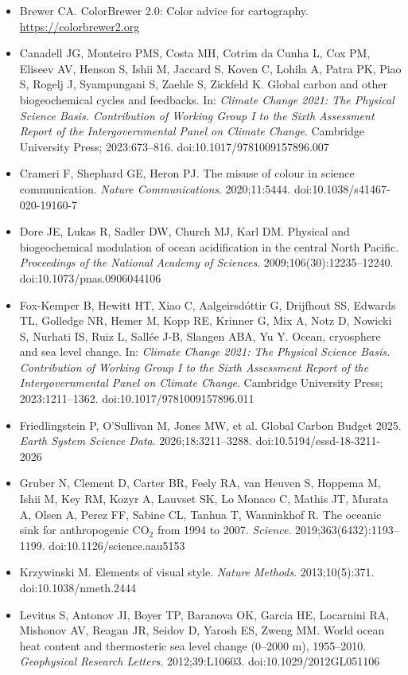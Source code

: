{\sloppy
\begin{itemize}
\item Brewer CA. ColorBrewer 2.0: Color advice for cartography. \url{https://colorbrewer2.org}
\item Canadell JG, Monteiro PMS, Costa MH, Cotrim da Cunha L, Cox PM, Eliseev AV, Henson S, Ishii M, Jaccard S, Koven C, Lohila A, Patra PK, Piao S, Rogelj J, Syampungani S, Zaehle S, Zickfeld K. Global carbon and other biogeochemical cycles and feedbacks. In: \textit{Climate Change 2021: The Physical Science Basis. Contribution of Working Group I to the Sixth Assessment Report of the Intergovernmental Panel on Climate Change}. Cambridge University Press; 2023:673--816. doi:10.1017/9781009157896.007
\item Crameri F, Shephard GE, Heron PJ. The misuse of colour in science communication. \textit{Nature Communications}. 2020;11:5444. doi:10.1038/s41467-020-19160-7
\item Dore JE, Lukas R, Sadler DW, Church MJ, Karl DM. Physical and biogeochemical modulation of ocean acidification in the central North Pacific. \textit{Proceedings of the National Academy of Sciences}. 2009;106(30):12235--12240. doi:10.1073/pnas.0906044106
\item Fox-Kemper B, Hewitt HT, Xiao C, A\dh algeirsd\'ottir G, Drijfhout SS, Edwards TL, Golledge NR, Hemer M, Kopp RE, Krinner G, Mix A, Notz D, Nowicki S, Nurhati IS, Ruiz L, Sall\'ee J-B, Slangen ABA, Yu Y. Ocean, cryosphere and sea level change. In: \textit{Climate Change 2021: The Physical Science Basis. Contribution of Working Group I to the Sixth Assessment Report of the Intergovernmental Panel on Climate Change}. Cambridge University Press; 2023:1211--1362. doi:10.1017/9781009157896.011
\item Friedlingstein P, O'Sullivan M, Jones MW, et al. Global Carbon Budget 2025. \textit{Earth System Science Data}. 2026;18:3211--3288. doi:10.5194/essd-18-3211-2026
\item Gruber N, Clement D, Carter BR, Feely RA, van Heuven S, Hoppema M, Ishii M, Key RM, Kozyr A, Lauvset SK, Lo Monaco C, Mathis JT, Murata A, Olsen A, Perez FF, Sabine CL, Tanhua T, Wanninkhof R. The oceanic sink for anthropogenic $\text{CO}_2$ from 1994 to 2007. \textit{Science}. 2019;363(6432):1193--1199. doi:10.1126/science.aau5153
\item Krzywinski M. Elements of visual style. \textit{Nature Methods}. 2013;10(5):371. doi:10.1038/nmeth.2444
\item Levitus S, Antonov JI, Boyer TP, Baranova OK, Garcia HE, Locarnini RA, Mishonov AV, Reagan JR, Seidov D, Yarosh ES, Zweng MM. World ocean heat content and thermosteric sea level change (0--2000 m), 1955--2010. \textit{Geophysical Research Letters}. 2012;39:L10603. doi:10.1029/2012GL051106

\end{itemize}}
